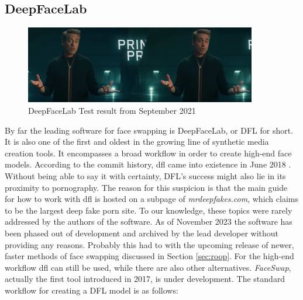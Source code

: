 \documentclass[
  a4paper,  %
  twoside,  %
  bibliography=totoc,
  headsepline,
  cleardoublepage=empty,
  parskip=half,
  draft=false
]{scrbook}
\begin{document}
\subsection{DeepFaceLab}
\begin{figure}[h]
  \centering
  \includegraphics[width=0.9\textwidth]{./graphics/images/dfl-demo.png}
  \caption{DeepFaceLab Test result from September 2021}
  \label{fig:dfl-sample}
\end{figure}
By far the leading software for face swapping is DeepFaceLab, or DFL for short. It is also one of the first and oldest in the growing line of synthetic media creation tools. It encompasses a broad workflow in order to create high-end face models. According to the commit history, \gls{dfl} came into existence in June 2018 \cite{iperovCommitsIperovDeepFaceLab}. Without being able to say it with certainty, DFL's success might also lie in its proximity to pornography. The reason for this suspicion is that the main guide for how to work with \gls{dfl} is hosted on a subpage of \textit{mrdeepfakes.com}, which claims to be the largest deep fake porn site. To our knowledge, these topics were rarely addressed by the authors of the software. As of November 2023 the software has been phased out of development and archived by the lead developer without providing any reasons. Probably this had to with the upcoming release of newer, faster methods of face swapping discussed in Section \ref{sec:roop}. For the high-end workflow \gls{dfl} can still be used, while there are also other alternatives. \textit{FaceSwap}, actually the first tool introduced in 2017, is under development. The standard workflow for creating a DFL model is as follows:
\end{document}

